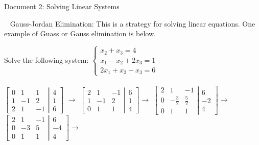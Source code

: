 \documentclass[12pt]{article}
\begin{document}
\begin{center}
Document 2: Solving Linear Systems
\end{center}

\setlength{\leftskip}{0in}
$\,\,\,$ Gauss-Jordan Elimination: This is a strategy for solving linear equations. One example of Guass or Gauss elimination is below.

Solve the following system:
$
\left\lbrace
\begin{matrix}
x_2+x_3=4\\
x_1-x_2+2x_3=1\\
2x_1+x_2-x_3=6
\end{matrix}
\right.
$\\\\

$\left[\left.\begin{matrix}
0 & 1 & 1\\
1 & -1 & 2\\
2 & 1 & -1
\end{matrix}
\right|
\begin{matrix}
4\\
1\\
6
\end{matrix}
\right]
$
$\rightarrow$
$\left[\left.\begin{matrix}
2 & 1 & -1\\
1 & -1 & 2\\
0 & 1 & 1
\end{matrix}
\right|
\begin{matrix}
6\\
1\\
4
\end{matrix}
\right]
\rightarrow$
$\left[\left.\begin{matrix}
2 & 1 & -1\\
0 & -\frac{3}{2} & \frac{5}{2}\\
0 & 1 & 1
\end{matrix}
\right|
\begin{matrix}
6\\
-2\\
4
\end{matrix}
\right]
\rightarrow$
$\left[\left.\begin{matrix}
2 & 1 & -1\\
0 & -3 & 5\\
0 & 1 & 1
\end{matrix}
\right|
\begin{matrix}
6\\
-4\\
4
\end{matrix}
\right]
\rightarrow$\\\\
\end{document}
